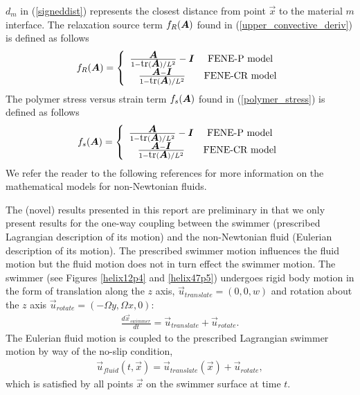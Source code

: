 \documentclass[]{article}
\newcommand{\bmA}{\mbox{\boldmath $A$\unboldmath}}
\newcommand{\bmI}{\mbox{\boldmath $I$\unboldmath}}
\begin{document}
$d_{m}$ in (\ref{signeddist}) represents the closest distance from point 
$\vec{x}$ to the material $m$ interface.  The relaxation source term 
$f_{R}(\bmA)$ found in (\ref{upper_convective_deriv}) is defined as
follows
\begin{eqnarray}
	f_{R}(\bmA)=\left\{ \begin{array}{cc}
		\frac{\bmA}{1-\mbox{tr}(\bmA)/L^{2}}-\bmI &
		\mbox{FENE-P model} \\
		\frac{\bmA-\bmI}{1-\mbox{tr}(\bmA)/L^{2}} &
		                \mbox{FENE-CR model}
	\end{array}
	\right.
\end{eqnarray}
The polymer stress versus strain term $f_{s}(\bmA)$ found in
(\ref{polymer_stress}) is defined as follows
\begin{eqnarray}
	f_{s}(\bmA)=\left\{ \begin{array}{cc}
		\frac{\bmA}{1-\mbox{tr}(\bmA)/L^{2}}-\bmI &
		\mbox{FENE-P model} \\
		\frac{\bmA-\bmI}{1-\mbox{tr}(\bmA)/L^{2}} &
		                \mbox{FENE-CR model}
	\end{array}
	\right.
\end{eqnarray}
We refer the reader to the following references for more information on
the mathematical models for non-Newtonian 
fluids\cite{BIRD1980213,PURNODE19981}.

The (novel) results presented in this report are preliminary in that we only 
present results for the one-way coupling between the 
swimmer (prescribed Lagrangian description of its motion)
and the non-Newtonian fluid (Eulerian description of its motion).  The
prescribed swimmer motion influences the fluid motion but the fluid 
motion does not in turn effect the swimmer motion.  The swimmer (see
Figures \ref{helix12p4} and \ref{helix47p5}) undergoes 
rigid body motion in the form of
translation along the $z$ axis, $\vec{u}_{translate}=(0,0,w)$ and 
rotation about the $z$ axis $\vec{u}_{rotate}=(-\Omega y,\Omega x,0)$:
\begin{eqnarray}
	\frac{d\vec{x}_{swimmer}}{dt}= 
	\vec{u}_{translate}+\vec{u}_{rotate}.
\end{eqnarray}
The Eulerian fluid motion is coupled to the prescribed Lagrangian
swimmer motion by way of the no-slip condition,
\begin{eqnarray}
	\vec{u}_{fluid}(t,\vec{x})=
	\vec{u}_{translate}(\vec{x})+\vec{u}_{rotate},
\end{eqnarray}
which is satisfied by all points $\vec{x}$ on the swimmer surface at time
$t$.
\end{document}
